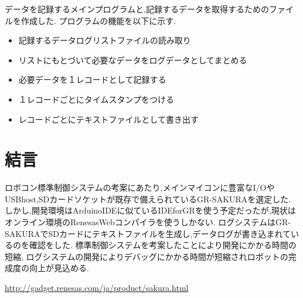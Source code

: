 \documentclass[twocolumn,11pt]{abst}
\begin{document}
データを記録するメインプログラムと,記録するデータを取得するためのファイルを作成した.
プログラムの機能を以下に示す.
\begin{itemize}
 \item 記録するデータログリストファイルの読み取り
 \item リストにもとづいて必要なデータをログデータとしてまとめる
 \item 必要データを１レコードとして記録する
 \item １レコードごとにタイムスタンプをつける
 \item レコードごとにテキストファイルとして書き出す
\end{itemize}


\section{結言}

ロボコン標準制御システムの考案にあたり,メインマイコンに豊富なI/OやUSBhost,SDカードソケットが既存で備えられているGR-SAKURAを選定した.
しかし,開発環境はArduinoIDEに似ているIDEforGRを使う予定だったが,現状はオンライン環境のRenesasWebコンパイラを使うしかない.
ログシステムはGR-SAKURAでSDカードにテキストファイルを生成し,データログが書き込まれているのを確認をした.
標準制御システムを考案したことにより開発にかかる時間の短縮,
ログシステムの開発によりデバッグにかかる時間が短縮されロボットの完成度の向上が見込める.

\begin{thebibliography}{8}


 \url{http://gadget.renesas.com/ja/product/sakura.html}

\end{thebibliography}
\end{document}

